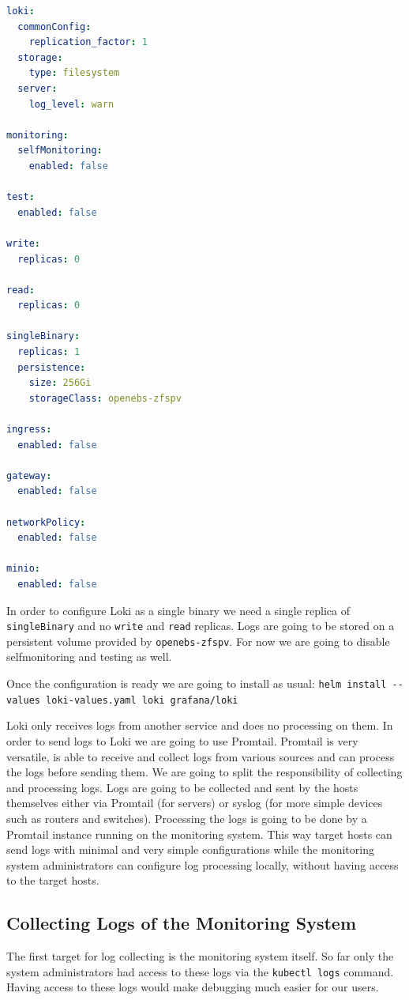 \begin{lstlisting}[language=yaml,caption=loki-values.yml]
loki:
  commonConfig:
    replication_factor: 1
  storage:
    type: filesystem
  server:
    log_level: warn

monitoring:
  selfMonitoring:
    enabled: false

test:
  enabled: false

write:
  replicas: 0

read:
  replicas: 0

singleBinary:
  replicas: 1
  persistence:
    size: 256Gi
    storageClass: openebs-zfspv

ingress:
  enabled: false

gateway:
  enabled: false

networkPolicy:
  enabled: false

minio:
  enabled: false
\end{lstlisting}

In order to configure Loki as a single binary we need a single replica of
\verb+singleBinary+ and no \verb+write+ and \verb+read+ replicas. Logs are
going to be stored on a persistent volume provided by \verb+openebs-zfspv+. For
now we are going to disable selfmonitoring and testing as well.

Once the configuration is ready we are going to install as usual:
\verb+helm install --values loki-values.yaml loki grafana/loki+

Loki only receives logs from another service and does no processing on them. In
order to send logs to Loki we are going to use Promtail. Promtail is very
versatile, is able to receive and collect logs from various sources and can
process the logs before sending them. We are going to split the responsibility
of collecting and processing logs. Logs are going to be collected and sent by
the hosts themselves either via Promtail (for servers) or syslog (for more
simple devices such as routers and switches). Processing the logs is going to
be done by a Promtail instance running on the monitoring system. This way
target hosts can send logs with minimal and very simple configurations while
the monitoring system administrators can configure log processing locally,
without having access to the target hosts.

\subsection{Collecting Logs of the Monitoring System}

The first target for log collecting is the monitoring system itself. So far
only the system administrators had access to these logs via the
\verb+kubectl logs+ command. Having access to these logs would make debugging
much easier for our users.

